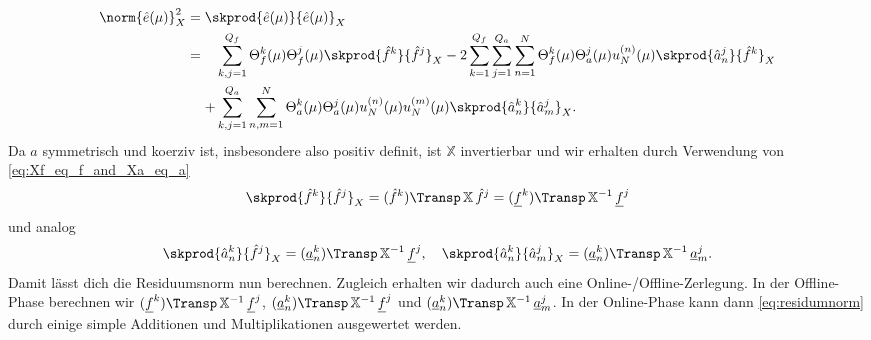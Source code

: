\begin{align}
    \label{eq:residumnorm}
    \norm{\hat e(\mu)}^2_X
    &= \skprod{\hat e(\mu)}{\hat e(\mu)}_X \\
    &=
    \begin{aligned}[t]
    &\sum_{k, j = 1}^{Q_f} \Theta_f^k(\mu) \Theta_f^j(\mu) \skprod{\hat f^k}{\hat f^j}_X - 2 \sum_{k = 1}^{Q_f} \sum_{j = 1}^{Q_a} \sum_{n = 1}^N \Theta_f^k(\mu) \Theta_a^j(\mu) u_N^{(n)}(\mu) \skprod{\hat a^j_n}{\hat f^k}_X \\
    + &\sum_{k, j = 1}^{Q_a} \sum_{n, m = 1}^N \Theta_a^k(\mu) \Theta_a^j(\mu) u_N^{(n)}(\mu)u_N^{(m)}(\mu) \skprod{\hat a_n^k}{\hat a_m^j}_X.
    \end{aligned}
\end{align}
Da $a$ symmetrisch und koerziv ist, insbesondere also positiv definit, ist $\mathbb{X}$ invertierbar und wir erhalten durch Verwendung von \eqref{eq:Xf_eq_f_and_Xa_eq_a}
\begin{equation}
    \skprod{\hat f^k}{\hat f^j}_X = (\hat f^k)\Transp \, \mathbb{X} \, \hat f^j = (\underline f^k)\Transp \, \mathbb{X}^{-1} \, \underline f^j
\end{equation}
und analog
\begin{equation}
    \skprod{\hat a^k_n}{\hat f^j}_X = (\underline a^k_n)\Transp \, \mathbb{X}^{-1} \, \underline f^j,
    \quad \skprod{\hat a^k_n}{\hat a^j_m}_X = (\underline a^k_n)\Transp \, \mathbb{X}^{-1} \, \underline a^j_m.
\end{equation}
Damit lässt dich die Residuumsnorm nun berechnen. Zugleich erhalten wir dadurch auch eine Online-/Offline-Zerlegung. In der Offline-Phase berechnen wir $(\underline f^k)\Transp \, \mathbb{X}^{-1} \, \underline f^j$, $(\underline a^k_n)\Transp \, \mathbb{X}^{-1} \, \underline f^j$ und $(\underline a^k_n)\Transp \, \mathbb{X}^{-1} \, \underline a^j_m$. In der Online-Phase kann dann \eqref{eq:residumnorm} durch einige simple Additionen und Multiplikationen ausgewertet werden.


